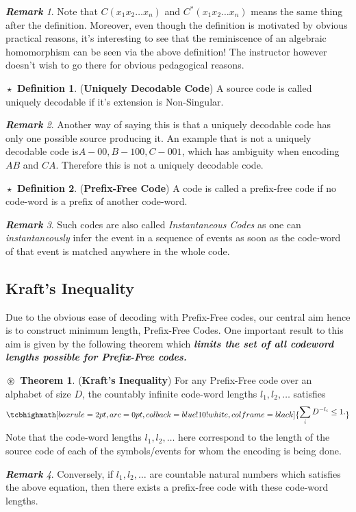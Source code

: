 \documentclass{article}
\theoremstyle{definition}
\newtheorem{definition}{$\boxed{\star}$ Definition}
\newtheorem{theorem}{$\boxed{\boxed{\circledast}}$ Theorem}
\theoremstyle{remark}
\newtheorem*{remark}{\textbf{Remark}}
\theoremstyle{definition}
\theoremstyle{definition}
\theoremstyle{definition}
\newcommand{\theoreq}[1]{
		\tcbhighmath[boxrule=2pt,arc=0pt,colback=blue!10!white,colframe=black]{\begin{aligned}
				#1
		\end{aligned}}}
\begin{document}
\begin{remark}
	Note that $ C(x_1 x_2\dots x_n) $ and $ C^{*}(x_1 x_2\dots x_n) $ means the same thing after the definition. Moreover, even though the definition is motivated by obvious practical reasons, it's interesting to see that the reminiscence of an algebraic homomorphism can be seen via the above definition! The instructor however doesn't wish to go there for obvious pedagogical reasons.
\end{remark}
\hrulefill
\begin{definition}
	(\textbf{Uniquely Decodable Code}) A source code is called uniquely decodable if it's extension is Non-Singular.
\end{definition}
\begin{remark}
	Another way of saying this is that a uniquely decodable code has only one possible source producing it. An example that is not a uniquely decodable code is$ A - 00, B - 100, C- 001 $, which has ambiguity when encoding $ AB $ and $ CA $. Therefore this is not a uniquely decodable code.
\end{remark}
\hrulefill
\begin{definition}
	(\textbf{Prefix-Free Code}) A code is called a prefix-free code if no code-word is a prefix of another code-word.
\end{definition}
\begin{remark}
	Such codes are also called \emph{Instantaneous Codes} as one can \emph{instantaneously} infer the event in a sequence of events as soon as the code-word of that event is matched anywhere in the whole code.
\end{remark}
\hrulefill
\newpage
\subsection{Kraft's Inequality}
Due to the obvious ease of decoding with Prefix-Free codes, our central aim hence is to construct minimum length, Prefix-Free Codes. One important result to this aim is given by the following theorem which \textbf{\emph{limits the set of all codeword lengths possible for Prefix-Free codes.}}
\begin{theorem}
	(\textbf{Kraft's Inequality}) For any Prefix-Free code over an alphabet of size $ D $, the countably infinite code-word lengths $ l_1,l_2,\dots $ satisfies
	\begin{equation}\label{E-35}
		\theoreq{\sum_{i } D^{-l_i} \le 1.}
	\end{equation}
Note that the code-word lengths $ l_1,l_2,\dots $ here correspond to the length of the source code of each of the symbols/events for whom the encoding is being done.
\end{theorem}
\begin{remark}
	Conversely, if $ l_1,l_2,\dots $ are countable natural numbers which satisfies the above equation, then there exists a prefix-free code with these code-word lengths. 
\end{remark}
\hrulefill
\end{document}
